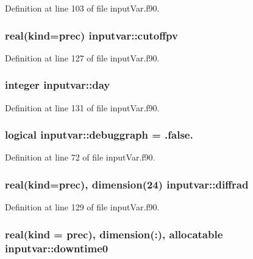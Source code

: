 Definition at line 103 of file input\-Var.\-f90.

\hypertarget{classinputvar_ab8f560a60d07ea2ec86b99b42e799877}{
\subsubsection[{cutoffpv}]{\setlength{\rightskip}{0pt plus 5cm}real(kind=prec) inputvar\-::cutoffpv}}\label{classinputvar_ab8f560a60d07ea2ec86b99b42e799877}


Definition at line 127 of file input\-Var.\-f90.

\hypertarget{classinputvar_af0f2faabf3f021accc56491cdcf43db5}{
\subsubsection[{day}]{\setlength{\rightskip}{0pt plus 5cm}integer inputvar\-::day}}\label{classinputvar_af0f2faabf3f021accc56491cdcf43db5}


Definition at line 131 of file input\-Var.\-f90.

\hypertarget{classinputvar_a947a874d54b261f96d17c5030a87d4e4}{
\subsubsection[{debuggraph}]{\setlength{\rightskip}{0pt plus 5cm}logical inputvar\-::debuggraph = .false.}}\label{classinputvar_a947a874d54b261f96d17c5030a87d4e4}


Definition at line 72 of file input\-Var.\-f90.

\hypertarget{classinputvar_a29749af38c4932d37115166f23b769a3}{
\subsubsection[{diffrad}]{\setlength{\rightskip}{0pt plus 5cm}real(kind=prec), dimension(24) inputvar\-::diffrad}}\label{classinputvar_a29749af38c4932d37115166f23b769a3}


Definition at line 129 of file input\-Var.\-f90.

\hypertarget{classinputvar_aaab84ab253f188eacce25a200a4ab300}{
\subsubsection[{downtime0}]{\setlength{\rightskip}{0pt plus 5cm}real(kind = prec), dimension(\-:), allocatable inputvar\-::downtime0}}\label{classinputvar_aaab84ab253f188eacce25a200a4ab300}


